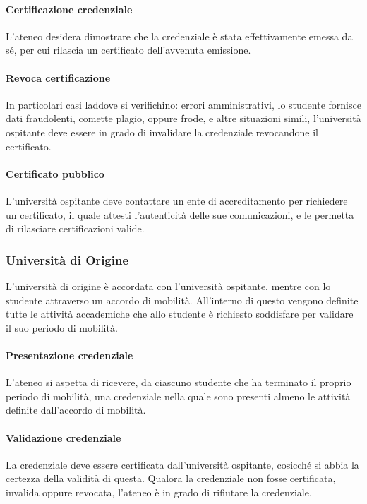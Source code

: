 \documentclass[a4paper,12pt]{article}
\begin{document}
\paragraph{Certificazione credenziale} L'ateneo desidera dimostrare che la credenziale è stata effettivamente emessa da sé, per cui rilascia un certificato dell'avvenuta emissione.
\paragraph{Revoca certificazione} In particolari casi laddove si verifichino: errori amministrativi, lo studente fornisce dati fraudolenti, comette plagio, oppure frode, e altre situazioni simili, l'università ospitante deve essere in grado di invalidare la credenziale revocandone il certificato.
\paragraph{Certificato pubblico} L'università ospitante deve contattare un ente di accreditamento per richiedere un certificato, il quale attesti l'autenticità delle sue comunicazioni, e le permetta di rilasciare certificazioni valide.

\subsubsection{Università di Origine}
L'università di origine è accordata con l'università ospitante, mentre con lo studente attraverso un accordo di mobilità. All'interno di questo vengono definite tutte le attività accademiche che allo studente è richiesto soddisfare per validare il suo periodo di mobilità.
\paragraph{Presentazione credenziale} L'ateneo si aspetta di ricevere, da ciascuno studente che ha terminato il proprio periodo di mobilità, una credenziale nella quale sono presenti almeno le attività definite dall'accordo di mobilità.
\paragraph{Validazione credenziale} La credenziale deve essere certificata dall'università ospitante, cosicché si abbia la certezza della validità di questa. Qualora la credenziale non fosse certificata, invalida oppure revocata, l'ateneo è in grado di rifiutare la credenziale.
\end{document}
